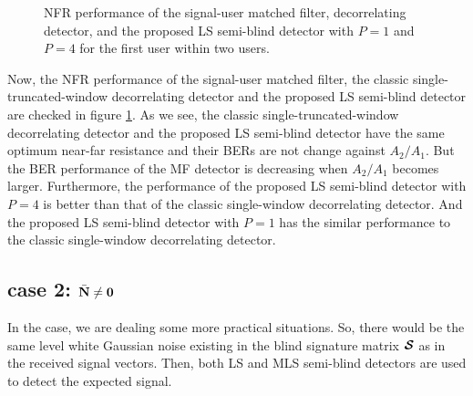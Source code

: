 \documentclass[a4paper,10pt,fleqn, twocolumn]{IEEETran}
\newcommand{\bN}{{\bf N}}
\newcommand{\bcS}{{\mbox {\boldmath ${\cal S}$}}}
\begin{document}
\begin{figure}
\caption{NFR performance of the signal-user matched filter,
decorrelating detector, and the proposed LS semi-blind detector
with $P=1$ and $P=4$ for the first user within two users.}
\label{NFR0}
\end{figure}

Now, the NFR performance of the signal-user matched filter, the
classic single-truncated-window decorrelating detector and the
proposed LS semi-blind detector are checked in figure \ref{NFR0}.
As we see, the classic single-truncated-window decorrelating
detector and the proposed LS semi-blind detector have the same
optimum near-far resistance and their BERs are not change against
$A_2/A_1$. But the BER performance of the MF detector is
decreasing when $A_2/A_1$ becomes larger. Furthermore, the
performance of the proposed LS semi-blind detector with $P=4$ is
better than that of the classic single-window decorrelating
detector. And the proposed LS semi-blind detector with $P=1$ has
the similar performance to the classic single-window decorrelating
detector.

\subsection*{case 2: $\bar{\bN} \neq \mathbf{0}$}

In the case, we are dealing some more practical situations. So,
there would be the same level white Gaussian noise existing in the
blind signature matrix $\bcS$ as in the received signal vectors.
Then, both LS and MLS semi-blind detectors are used to detect the
expected signal.
\end{document}
